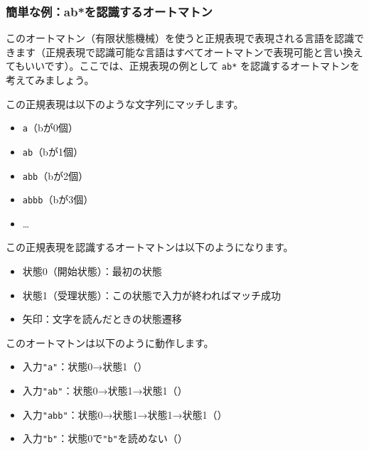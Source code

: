 \subsubsection{簡単な例：ab*を認識するオートマトン}

このオートマトン（有限状態機械）を使うと正規表現で表現される言語を認識できます（正規表現で認識可能な言語はすべてオートマトンで表現可能と言い換えてもいいです）。ここでは、正規表現の例として
\texttt{ab*} を認識するオートマトンを考えてみましょう。

この正規表現は以下のような文字列にマッチします。

\begin{itemize}
\item
  \texttt{a}（bが0個）
\item
  \texttt{ab}（bが1個）
\item
  \texttt{abb}（bが2個）
\item
  \texttt{abbb}（bが3個）
\item
  \ldots{}
\end{itemize}

この正規表現を認識するオートマトンは以下のようになります。

\begin{center}
\end{center}

\begin{itemize}
\item
  状態0（開始状態）：最初の状態
\item
  状態1（受理状態）：この状態で入力が終わればマッチ成功
\item
  矢印：文字を読んだときの状態遷移
\end{itemize}

このオートマトンは以下のように動作します。

\begin{itemize}
\item
  入力\verb|"a"|：状態0→状態1（）
\item
  入力\verb|"ab"|：状態0→状態1→状態1（）
\item
  入力\verb|"abb"|：状態0→状態1→状態1→状態1（）
\item
  入力\verb|"b"|：状態0で\verb|"b"|を読めない（）
\end{itemize}

